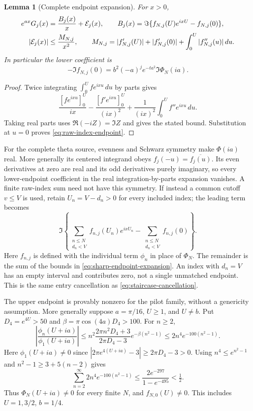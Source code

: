 \documentclass[11pt]{article}
\numberwithin{equation}{section}
\newtheorem{lemma}[theorem]{Lemma}
\theoremstyle{definition}
\theoremstyle{remark}
\newcommand{\dd}{\,d}
\begin{document}
\begin{lemma}[Complete endpoint expansion]\label{lem:sharp-endpoints}
For $x>0$,
\begin{align}
 e^{ax}G_j(x)&=\frac{B_j(x)}x+\mathcal E_j(x),\qquad
 B_j(x)=\Im\{f_{N,j}(U)e^{ixU}-f_{N,j}(0)\},\notag\\
 |\mathcal E_j(x)|&\le\frac{M_{N,j}}{x^2},\qquad
 M_{N,j}=|f'_{N,j}(U)|+|f'_{N,j}(0)|
                      +\int_0^U|f''_{N,j}(u)|\dd u.
 \label{eq:sharp-endpoint-expansion}
\end{align}
In particular the lower coefficient is
\begin{equation}
 -\Im f_{N,j}(0)=b^2(-a)^j e^{-ta^2}\Im\Phi_N(ia).
 \label{eq:raw-index-endpoint}
\end{equation}
\end{lemma}
\begin{proof}
Twice integrating $\int_0^Ufe^{ixu}\dd u$ by parts gives
\[
 \frac{[fe^{ixu}]_0^U}{ix}
 -\frac{[f'e^{ixu}]_0^U}{(ix)^2}
 +\frac{1}{(ix)^2}\int_0^Uf''e^{ixu}\dd u.
\]
Taking real parts uses $\Re(-iZ)=\Im Z$ and gives the stated bound.
Substitution at $u=0$ proves \eqref{eq:raw-index-endpoint}.
\end{proof}

For the complete theta source, evenness and Schwarz symmetry make
$\Phi(ia)$ real. More generally its centered integrand obeys
$f_j(-u)=\overline{f_j(u)}$. Its even derivatives at zero are real
and its odd derivatives purely imaginary, so every lower-endpoint
coefficient in the real integration-by-parts expansion vanishes.
A finite raw-index sum need not have this symmetry.
If instead a common cutoff $v\le V$ is used, retain
$U_n=V-d_n>0$ for every included index; the leading term becomes
\[
 \Im\left\{\sum_{\substack{n\le N\\d_n<V}}
 f_{n,j}(U_n)e^{ixU_n}
 -\sum_{\substack{n\le N\\d_n<V}}f_{n,j}(0)\right\}.
\]
Here $f_{n,j}$ is defined with the individual term $\phi_n$ in place
of $\Phi_N$. The remainder is the sum of the bounds in
\eqref{eq:sharp-endpoint-expansion}. An index with $d_n=V$ has an
empty interval and contributes zero, not a single unmatched endpoint.
This is the same entry cancellation as
\eqref{eq:staircase-cancellation}.

The upper endpoint is provably nonzero for the pilot family, without a
genericity assumption. More generally suppose
$a=\pi/16$, $U\ge1$, and $U\ne b$. Put $D_4=e^{4U}>50$ and
$\beta=\pi\cos(4a)D_4>100$. For $n\ge2$,
\[
 \left|\frac{\phi_n(U+ia)}{\phi_1(U+ia)}\right|
 \le n^2\frac{2\pi n^2D_4+3}{2\pi D_4-3}
             e^{-\beta(n^2-1)}
 \le2n^4e^{-100(n^2-1)}.
\]
Here $\phi_1(U+ia)\ne0$ since
$|2\pi e^{4(U+ia)}-3|\ge2\pi D_4-3>0$.
Using $n^4\le e^{n^2-1}$ and
$n^2-1\ge3+5(n-2)$ gives
\begin{equation}
 \sum_{n=2}^\infty2n^4e^{-100(n^2-1)}
 \le\frac{2e^{-297}}{1-e^{-495}}<\tfrac12.
 \label{eq:nonzero-sharp-endpoint}
\end{equation}
Thus $\Phi_N(U+ia)\ne0$ for every finite $N$, and
$f_{N,0}(U)\ne0$. This includes $U=1,3/2$, $b=1/4$.
\end{document}
